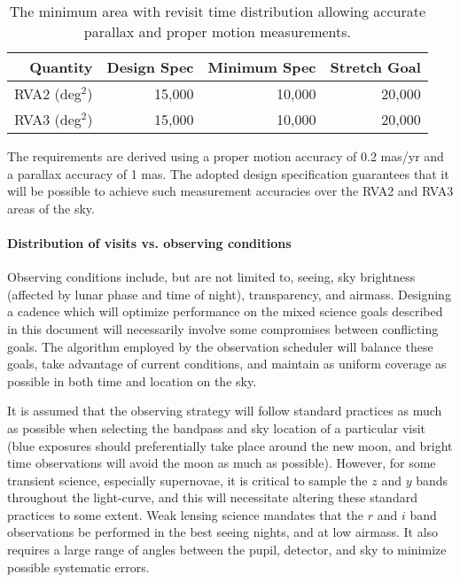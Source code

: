 \begin{table}[h]
\begin{tabular}{|r|r|r|r|}
\hline
Quantity            & Design Spec & Minimum Spec & Stretch Goal     \\
\hline
  RVA2  (deg$^2$)   &  15,000      &  10,000       &    20,000        \\
  RVA3  (deg$^2$)   &  15,000      &  10,000       &    20,000        \\
\hline
\end{tabular}
\caption{The minimum area with revisit time distribution allowing accurate
parallax and proper motion measurements.}
\label{TareaPM}
\end{table}

The requirements are derived using a proper motion accuracy of 0.2 mas/yr
and a parallax accuracy of 1 mas. The adopted design specification
guarantees that it will be possible to achieve such measurement accuracies
over the RVA2 and RVA3 areas of the sky.


\paragraph{Distribution of visits vs. observing conditions\\}

Observing conditions include, but are not limited to, seeing, sky
brightness (affected by lunar phase and time of night), transparency, and
airmass. Designing a cadence which will optimize performance on the mixed
science goals described in this document will necessarily involve some
compromises between conflicting goals. The algorithm employed by the
observation scheduler will balance these goals, take advantage of current
conditions, and maintain as uniform coverage as possible in both time and
location on the sky.

It is assumed that the observing strategy will follow standard practices as
much as possible when selecting the bandpass and sky location of a
particular visit (\eg blue exposures should preferentially take
place around the new moon, and bright time observations will avoid the moon
as much as possible). However, for some transient science, especially
supernovae, it is critical to sample the $z$ and $y$ bands throughout the
light-curve, and this will necessitate altering these standard practices to
some extent. Weak lensing science mandates that the $r$ and $i$ band
observations be performed in the best seeing nights, and at low airmass. It
also requires a large range of angles between the pupil, detector, and sky
to minimize possible systematic errors.



